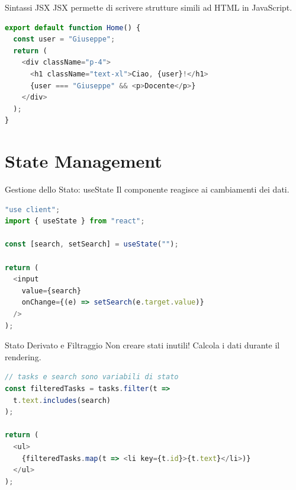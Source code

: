 \documentclass[10pt]{beamer}
\begin{document}
\begin{frame}[fragile]{Sintassi JSX}
    JSX permette di scrivere strutture simili ad HTML in JavaScript.
    \begin{lstlisting}[language=javascript]
export default function Home() {
  const user = "Giuseppe";
  return (
    <div className="p-4">
      <h1 className="text-xl">Ciao, {user}!</h1>
      {user === "Giuseppe" && <p>Docente</p>}
    </div>
  );
}
\end{lstlisting}
\end{frame}

\section{State Management}
\begin{frame}[fragile]{Gestione dello Stato: useState}
    Il componente reagisce ai cambiamenti dei dati.
    \begin{lstlisting}[language=javascript]
"use client";
import { useState } from "react";

const [search, setSearch] = useState("");

return (
  <input
    value={search}
    onChange={(e) => setSearch(e.target.value)}
  />
);
\end{lstlisting}
\end{frame}

\begin{frame}[fragile]{Stato Derivato e Filtraggio}
    Non creare stati inutili! Calcola i dati durante il rendering.
    \begin{lstlisting}[language=javascript]
// tasks e search sono variabili di stato
const filteredTasks = tasks.filter(t =>
  t.text.includes(search)
);

return (
  <ul>
    {filteredTasks.map(t => <li key={t.id}>{t.text}</li>)}
  </ul>
);
\end{lstlisting}
\end{frame}
\end{document}
